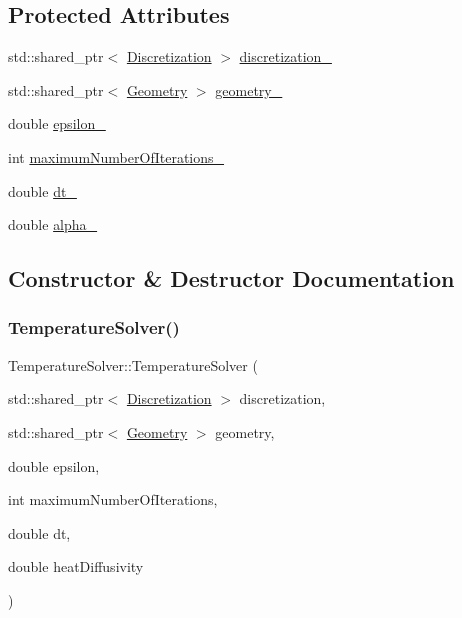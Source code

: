 \subsection*{Protected Attributes}
\begin{DoxyCompactItemize}
\item 
std\+::shared\+\_\+ptr$<$ \mbox{\hyperlink{classDiscretization}{Discretization}} $>$ \mbox{\hyperlink{classTemperatureSolver_a32233fcdbc79197eb307950a6eb249ea}{discretization\+\_\+}}
\item 
std\+::shared\+\_\+ptr$<$ \mbox{\hyperlink{classGeometry}{Geometry}} $>$ \mbox{\hyperlink{classTemperatureSolver_a823c14cccaba3b220b782a639adeda90}{geometry\+\_\+}}
\item 
double \mbox{\hyperlink{classTemperatureSolver_a29ac45f4b100cf3aeb4e7f065d5995ec}{epsilon\+\_\+}}
\item 
int \mbox{\hyperlink{classTemperatureSolver_ae0bc734676e4237f6c7e9733d90322f2}{maximum\+Number\+Of\+Iterations\+\_\+}}
\item 
double \mbox{\hyperlink{classTemperatureSolver_a6740a17de0452a7775413bbfd9971f8e}{dt\+\_\+}}
\item 
double \mbox{\hyperlink{classTemperatureSolver_a71d847755489bd84958599f09757c5ce}{alpha\+\_\+}}
\end{DoxyCompactItemize}


\subsection{Constructor \& Destructor Documentation}
\mbox{\label{classTemperatureSolver_a8e3ca429cd802f7d8753f6e08cb70010}} 
\subsubsection{\texorpdfstring{TemperatureSolver()}{TemperatureSolver()}}
{\footnotesize\ttfamily Temperature\+Solver\+::\+Temperature\+Solver (\begin{DoxyParamCaption}\item[{std\+::shared\+\_\+ptr$<$ \mbox{\hyperlink{classDiscretization}{Discretization}} $>$}]{discretization,  }\item[{std\+::shared\+\_\+ptr$<$ \mbox{\hyperlink{classGeometry}{Geometry}} $>$}]{geometry,  }\item[{double}]{epsilon,  }\item[{int}]{maximum\+Number\+Of\+Iterations,  }\item[{double}]{dt,  }\item[{double}]{heat\+Diffusivity }\end{DoxyParamCaption})}



